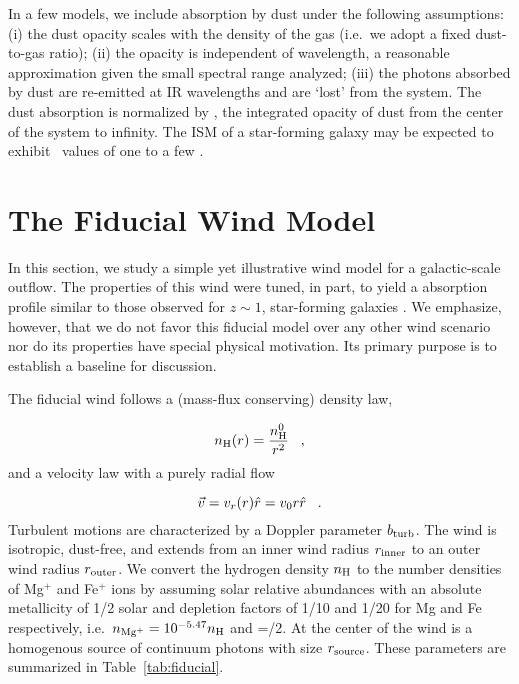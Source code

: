\documentclass[12pt,preprint]{aastex}
\begin{document}
In a few models, we include absorption by dust under the following
assumptions:
(i) the dust opacity scales with the density of the gas (i.e.\ we
adopt a fixed dust-to-gas ratio);
(ii) the opacity is independent of wavelength, a reasonable
approximation given the small spectral range analyzed;
(iii) the photons absorbed by dust are re-emitted at IR wavelengths
and are `lost' from the system.  The dust absorption is normalized by \taud, 
the integrated opacity of dust from the center of the system to
infinity.  The ISM of a star-forming galaxy may be expected to exhibit
\taud\ values of one to a few \citep[e.g.][]{dust_again}.



\section{The Fiducial Wind Model}
\label{sec:fiducial}

In this section, we study a simple yet illustrative wind model for
a galactic-scale outflow.  The properties of this wind were tuned, in
part, to yield a  absorption profile 
similar to those observed for $z \sim 1$, star-forming galaxies
\citep{wcp+09,rubin+10b}.  We emphasize, however, that we do not
favor this fiducial model over any other wind scenario nor do its
properties have special physical motivation.
Its primary purpose is to establish a baseline
for discussion.

The fiducial wind follows a (mass-flux conserving) density law,

\begin{equation}
n_{\rm H} (r) = \frac{n^0_{\rm H}}{r^2} \;\;\; , 
\label{eqn:density}
\end{equation}
and a velocity law with a purely radial flow

\begin{equation}
\vec v = v_r (r) \hat r = v_0 r \hat r  \;\;\; .
\label{eqn:vel}
\end{equation}
Turbulent motions are
characterized by a Doppler parameter $b_{\rm turb}$.  
The wind is isotropic, dust-free, and extends from an inner wind
radius $r_{\rm inner}$ to an outer wind radius $r_{\rm outer}$.  
We convert the hydrogen density $n_{\rm H}$ to the number densities of
Mg$^+$ and Fe$^+$ ions by assuming solar relative abundances with an
absolute metallicity of 1/2 solar and depletion factors of 1/10 and
1/20 for Mg and Fe respectively, i.e.\  $n_{\rm Mg^+} = 10^{-5.47} n_{\rm H}$ 
and \nfe=\nmg/2. At the center of the wind is a homogenous source of
continuum photons with size $r_{\rm source}$. These parameters are
summarized in Table~\ref{tab:fiducial}.   
\end{document}
